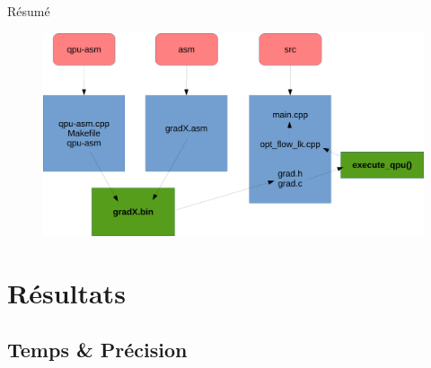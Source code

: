 \documentclass{bredelebeamer}
\begin{document}

\begin{frame}{Résumé}

\begin{figure}
\centering
\includegraphics[scale=0.3]{images/projectResume.pdf}
\end{figure}

\end{frame}





\section{Résultats}


\subsection{Temps \& Précision}

\end{document}
